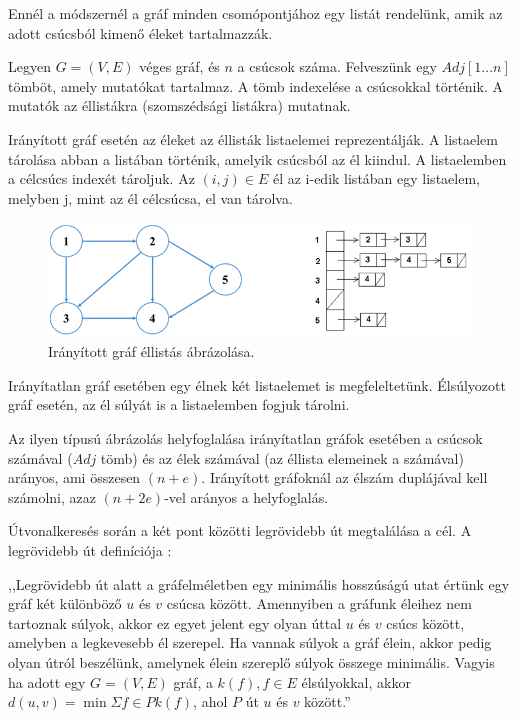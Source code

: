 
Ennél a módszernél a gráf minden csomópontjához egy listát rendelünk, amik az adott csúcsból kimenő éleket tartalmazzák.

Legyen $G = (V, E)$ véges gráf, és $n$ a csúcsok száma. Felveszünk egy $Adj[1 \ldots n]$ tömböt, amely mutatókat tartalmaz. A tömb indexelése a csúcsokkal történik. A mutatók az éllistákra (szomszédsági listákra) mutatnak.

Irányított gráf esetén az éleket az éllisták listaelemei reprezentálják. A listaelem tárolása abban a listában történik, amelyik csúcsból az él kiindul. A listaelemben a célcsúcs indexét tároljuk. Az $(i, j) \in E$ él az i-edik listában egy listaelem, melyben j, mint az él célcsúcsa, el van tárolva.

\begin{figure}[htb]
\centering
\includegraphics[scale=0.5]{kepek/ellista_iranyitott.png}
\caption{Irányított gráf éllistás ábrázolása.}
\label{fig:ellista_iranyitott}
\end{figure}

Irányítatlan gráf esetében egy élnek két listaelemet is megfeleltetünk. Élsúlyozott gráf esetén, az él súlyát is a listaelemben fogjuk tárolni.

Az ilyen típusú ábrázolás helyfoglalása irányítatlan gráfok esetében a csúcsok számával ($Adj$ tömb) és az élek számával (az éllista elemeinek a számával) arányos, ami összesen $(n + e)$. Irányított gráfoknál az élszám duplájával kell számolni, azaz $(n + 2e)$-vel arányos a helyfoglalás.


Útvonalkeresés során a két pont közötti legrövidebb út megtalálása a cél. A legrövidebb út definíciója \cite{legrovidebbut}:


,,Legrövidebb út alatt a gráfelméletben egy minimális hosszúságú utat értünk egy gráf két különböző $u$ és $v$ csúcsa között. Amennyiben a gráfunk éleihez nem tartoznak súlyok, akkor ez egyet jelent egy olyan úttal $u$ és $v$ csúcs között, amelyben a legkevesebb él szerepel. Ha vannak súlyok a gráf élein, akkor pedig olyan útról beszélünk, amelynek élein szereplő súlyok összege minimális. Vagyis ha adott egy $G = (V, E)$ gráf, a $k(f), f \in E$ élsúlyokkal, akkor $d(u, v) = \min \Sigma f \in P k(f)$, ahol $P$ út $u$ és $v$ között.''

